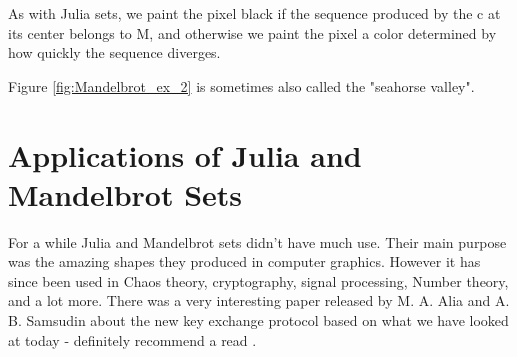 \documentclass[a4paper,11pt]{article}
\theoremstyle{definition}
\numberwithin{equation}{section} %
\begin{document}
As with Julia sets, we paint the pixel black if the sequence produced by the c at its center belongs to M, and otherwise we paint the pixel a color determined by how quickly the sequence diverges.


Figure \ref{fig:Mandelbrot_ex_2} is sometimes also called the "seahorse valley". 

\section{Applications of Julia and Mandelbrot Sets}

For a while Julia and Mandelbrot sets didn't have much use. Their main purpose was the amazing shapes they produced in computer graphics. However it has since been used in Chaos theory, cryptography, signal processing, Number theory, and a lot more. There was a very interesting paper released by M. A. Alia and A. B. Samsudin about the new key exchange protocol based on what we have looked at today - definitely recommend a read \cite{cryptography}.

\printbibliography
\end{document}

